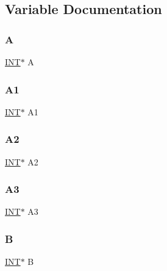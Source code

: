 \subsection{Variable Documentation}
\mbox{\label{costas_8_c_aca707001d4240cb0cd70022a0948ec5b}} 
\subsubsection{\texorpdfstring{A}{A}}
{\footnotesize\ttfamily \mbox{\hyperlink{galois_8h_a09fddde158a3a20bd2dcadb609de11dc}{I\+NT}}$\ast$ A}

\mbox{\label{costas_8_c_ab74e091224703c106c77917fb333458a}} 
\subsubsection{\texorpdfstring{A1}{A1}}
{\footnotesize\ttfamily \mbox{\hyperlink{galois_8h_a09fddde158a3a20bd2dcadb609de11dc}{I\+NT}}$\ast$ A1}

\mbox{\label{costas_8_c_ac5673a2d6d3999709f786fc1a3521aa7}} 
\subsubsection{\texorpdfstring{A2}{A2}}
{\footnotesize\ttfamily \mbox{\hyperlink{galois_8h_a09fddde158a3a20bd2dcadb609de11dc}{I\+NT}}$\ast$ A2}

\mbox{\label{costas_8_c_adb0d8a46d877766c3a4a9777eb0365a0}} 
\subsubsection{\texorpdfstring{A3}{A3}}
{\footnotesize\ttfamily \mbox{\hyperlink{galois_8h_a09fddde158a3a20bd2dcadb609de11dc}{I\+NT}}$\ast$ A3}

\mbox{\label{costas_8_c_ad1f767566c3189fb90e9cffcc5dd4680}} 
\subsubsection{\texorpdfstring{B}{B}}
{\footnotesize\ttfamily \mbox{\hyperlink{galois_8h_a09fddde158a3a20bd2dcadb609de11dc}{I\+NT}}$\ast$ B}

